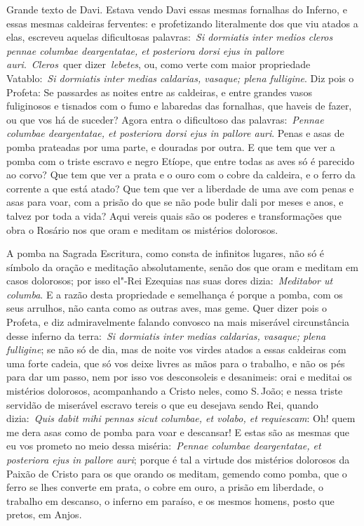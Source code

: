 Grande texto de Davi. Estava vendo Davi essas mesmas
fornalhas do Inferno, e essas mesmas caldeiras ferventes: e profetizando
literalmente dos que viu atados a elas, escreveu aquelas dificultosas
palavras:~\emph{Si dormiatis inter medios cleros pennae columbae
deargentatae, et posteriora dorsi ejus in pallore
auri}.~\emph{Cleros}~quer dizer~\emph{lebetes}, ou,
como verte com maior propriedade Vatablo:~\emph{Si dormiatis inter
medias caldarias, vasaque; plena fulligine}. Diz pois o Profeta: Se
passardes as noites entre as caldeiras, e entre grandes vasos
fuliginosos e tisnados com o fumo e labaredas das fornalhas, que haveis
de fazer, ou que vos há de suceder? Agora entra o dificultoso das
palavras:~\emph{Pennae columbae deargentatae, et posteriora dorsi ejus
in pallore auri}. Penas e asas de pomba prateadas por uma parte, e
douradas por outra. E que tem que ver a pomba com o triste escravo e
negro Etíope, que entre todas as aves só é parecido ao corvo? Que tem
que ver a prata e o ouro com o cobre da caldeira, e o ferro da corrente
a que está atado? Que tem que ver a liberdade de uma ave com penas e
asas para voar, com a prisão do que se não pode bulir dali por meses e
anos, e talvez por toda a vida? Aqui vereis quais são os poderes e
transformações que obra o Rosário nos que oram e meditam os mistérios
dolorosos.

A pomba na Sagrada Escritura, como consta de infinitos
lugares, não só é símbolo da oração e meditação absolutamente, senão dos
que oram e meditam em casos dolorosos; por isso el"-Rei Ezequias nas suas
dores dizia:~\emph{Meditabor ut columba}. E a razão
desta propriedade e semelhança é porque a pomba, com os seus arrulhos,
não canta como as outras aves, mas geme. Quer dizer pois o Profeta, e
diz admiravelmente falando convosco na mais miserável circunstância
desse inferno da terra:~\emph{Si dormiatis inter medias caldarias,
vasaque; plena fulligine}; se não só de dia, mas de noite vos virdes
atados a essas caldeiras com uma forte cadeia, que só vos deixe livres
as mãos para o trabalho, e não os pés para dar um passo, nem por isso
vos desconsoleis e desanimeis: orai e meditai os mistérios dolorosos,
acompanhando a Cristo neles, como S.\,João; e nessa triste servidão de
miserável escravo tereis o que eu desejava sendo Rei, quando
dizia:~\emph{Quis dabit mihi pennas sicut columbae, et volabo, et
requiescam}: Oh! quem me dera asas como de pomba para
voar e descansar! E estas são as mesmas que eu vos prometo no meio dessa
miséria:~\emph{Pennae columbae deargentatae, et posteriora ejus in
pallore auri}; porque é tal a virtude dos mistérios dolorosos da Paixão
de Cristo para os que orando os meditam, gemendo como pomba, que o ferro
se lhes converte em prata, o cobre em ouro, a prisão em liberdade, o
trabalho em descanso, o inferno em paraíso, e os mesmos homens, posto
que pretos, em Anjos.


